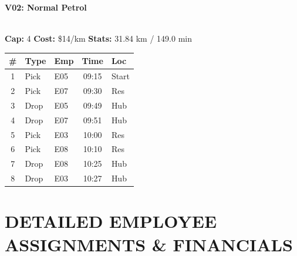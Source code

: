 \documentclass[a4paper,11pt]{article}
\begin{document}
\begin{minipage}[t]{0.49\textwidth}
    \centering
    \colorbox{velorablue}{\parbox{\dimexpr\linewidth-2\fboxsep}{\centering \color{white}\large\textbf{V02: Normal Petrol}}} \\
    \vspace{0.1cm}
    {\small \textbf{Cap:} 4 \quad \textbf{Cost:} \$14/km \quad \textbf{Stats:} 31.84 km / 149.0 min}
    
    \vspace{0.2cm}

    \renewcommand{\arraystretch}{1.2}
    \begin{tabular}{c l l c l}
        \toprule
        \textbf{\#} & \textbf{Type} & \textbf{Emp} & \textbf{Time} & \textbf{Loc} \\
        \midrule
        1 & \color{velorablue}Pick & E05 & 09:15 & Start \\
        \rowcolor{headergray} 2 & \color{velorablue}Pick & E07 & 09:30 & Res \\
        3 & Drop & E05 & 09:49 & Hub \\
        \rowcolor{headergray} 4 & Drop & E07 & 09:51 & Hub \\
        5 & \color{velorablue}Pick & E03 & 10:00 & Res \\
        \rowcolor{headergray} 6 & \color{velorablue}Pick & E08 & 10:10 & Res \\
        7 & Drop & E08 & 10:25 & Hub \\
        \rowcolor{headergray} 8 & Drop & E03 & 10:27 & Hub \\
        \bottomrule
    \end{tabular}
\end{minipage}

\vspace{0.5cm}

\section*{\uppercase{\color{velorablue} Detailed Employee Assignments \& Financials}}
\vspace{-0.2cm}
\end{document}
